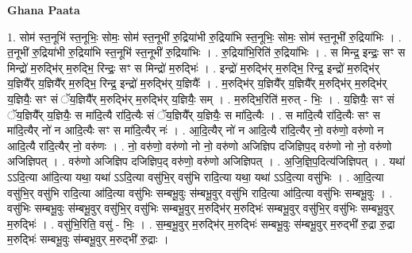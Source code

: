\documentclass[17pt]{extarticle}
\begin{document}
\textbf{Ghana Paata } \newline

1. सोम॑ स्त॒नूभि॑ स्त॒नूभिः॒ सोमः॒ सोम॑ स्त॒नूभी॑ रु॒द्रिया॑भी रु॒द्रिया॑भि स्त॒नूभिः॒ सोमः॒ सोम॑ स्त॒नूभी॑ रु॒द्रिया॑भिः । . त॒नूभी॑ रु॒द्रिया॑भी रु॒द्रिया॑भि स्त॒नूभि॑ स्त॒नूभी॑ रु॒द्रिया॑भिः । . रु॒द्रिया॑भि॒रिति॑ रु॒द्रिया॑भिः । . स मिन्द्र॒ इन्द्रः॒ सꣳ स मिन्द्रो॑ म॒रुद्भि॑र् म॒रुद्भि॒ रिन्द्रः॒ सꣳ स मिन्द्रो॑ म॒रुद्भिः॑ । . इन्द्रो॑ म॒रुद्भि॑र् म॒रुद्भि॒ रिन्द्र॒ इन्द्रो॑ म॒रुद्भि॑र् य॒ज्ञियै᳚र् य॒ज्ञियै᳚र् म॒रुद्भि॒ रिन्द्र॒ इन्द्रो॑ म॒रुद्भि॑र् य॒ज्ञियैः᳚ । . म॒रुद्भि॑र् य॒ज्ञियै᳚र् य॒ज्ञियै᳚र् म॒रुद्भि॑र् म॒रुद्भि॑र् य॒ज्ञियैः॒ सꣳ सं ॅय॒ज्ञियै᳚र् म॒रुद्भि॑र् म॒रुद्भि॑र् य॒ज्ञियैः॒ सम् । . म॒रुद्भि॒रिति॑ म॒रुत् - भिः॒ । . य॒ज्ञियैः॒ सꣳ सं ॅय॒ज्ञियै᳚र् य॒ज्ञियैः॒ स मा॑दि॒त्यै रा॑दि॒त्यैः सं ॅय॒ज्ञियै᳚र् य॒ज्ञियैः॒ स मा॑दि॒त्यैः । . स मा॑दि॒त्यै रा॑दि॒त्यैः सꣳ स मा॑दि॒त्यैर् नो॑ न आदि॒त्यैः सꣳ स मा॑दि॒त्यैर् नः॑ । . आ॒दि॒त्यैर् नो॑ न आदि॒त्यै रा॑दि॒त्यैर् नो॒ वरु॑णो॒ वरु॑णो न आदि॒त्यै रा॑दि॒त्यैर् नो॒ वरु॑णः । . नो॒ वरु॑णो॒ वरु॑णो नो नो॒ वरु॑णो अजिज्ञिप दजिज्ञिप॒द् वरु॑णो नो नो॒ वरु॑णो अजिज्ञिपत् । . वरु॑णो अजिज्ञिप दजिज्ञिप॒द् वरु॑णो॒ वरु॑णो अजिज्ञिपत् । . अ॒जि॒ज्ञि॒प॒दित्य॑जिज्ञिपत् । . यथा॑ ऽऽदि॒त्या आ॑दि॒त्या यथा॒ यथा॑ ऽऽदि॒त्या वसु॑भि॒र् वसु॑भि रादि॒त्या यथा॒ यथा॑ ऽऽदि॒त्या वसु॑भिः । . आ॒दि॒त्या वसु॑भि॒र् वसु॑भि रादि॒त्या आ॑दि॒त्या वसु॑भिः सम्बभू॒वुः स॑म्बभू॒वुर् वसु॑भि रादि॒त्या आ॑दि॒त्या वसु॑भिः सम्बभू॒वुः । . वसु॑भिः सम्बभू॒वुः स॑म्बभू॒वुर् वसु॑भि॒र् वसु॑भिः सम्बभू॒वुर् म॒रुद्भि॑र् म॒रुद्भिः॑ सम्बभू॒वुर् वसु॑भि॒र् वसु॑भिः सम्बभू॒वुर् म॒रुद्भिः॑ । . वसु॑भि॒रिति॒ वसु॑ - भिः॒ । . स॒म्ब॒भू॒वुर् म॒रुद्भि॑र् म॒रुद्भिः॑ सम्बभू॒वुः स॑म्बभू॒वुर् म॒रुद्भी॑ रु॒द्रा रु॒द्रा म॒रुद्भिः॑ सम्बभू॒वुः स॑म्बभू॒वुर् म॒रुद्भी॑ रु॒द्राः । \newline
\end{document}

